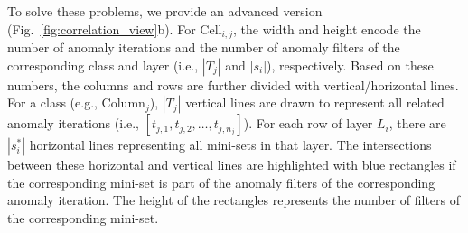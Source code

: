 \documentclass[format=acmsmall, review=false, screen=true]{acmart}
\begin{document}
To solve these problems, we provide an advanced version (Fig.~\ref{fig:correlation_view}b).
For $\mathrm{Cell}_{i,j}$, the width and height encode the number of anomaly iterations and the number of anomaly filters of the corresponding class and layer (i.e., $|T_j|$ and $|s_{i}|$), respectively.
Based on these numbers, the columns and rows are further divided with vertical/horizontal lines.
For a class (e.g., $\mathrm{Column}_{j}$), $|T_j|$ vertical lines are drawn to represent all related anomaly iterations (i.e., $[t_{j,1}, t_{j,2},\ldots,t_{j,n_j}]$).
For each row of layer $L_i$, there are  $|s_i^\ast|$ horizontal lines representing all mini-sets in that layer.
The intersections between these horizontal and vertical lines are highlighted with blue rectangles if the corresponding mini-set is part of the anomaly filters of the corresponding anomaly iteration.
The height of the rectangles represents the number of filters of the corresponding mini-set.
\end{document}
